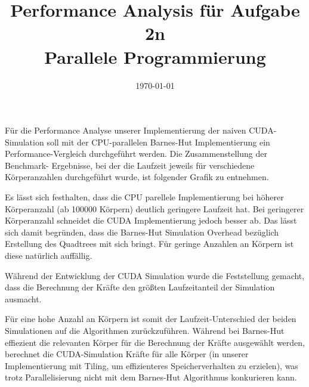 \documentclass[
  ngerman,
  color=8c,
  submission,
  boxarc,
  fleqn,
]{rubos-tuda-template}
\date{\today}
\begin{document}
\title[Parallele Programmierung]{Performance Analysis für Aufgabe 2n\\ Parallele Programmierung}
\maketitle{}

Für die Performance Analyse unserer Implementierung der naiven CUDA-Simulation soll mit der CPU-parallelen
Barnes-Hut Implementierung ein Performance-Vergleich durchgeführt werden. Die Zusammenstellung der Benchmark-
Ergebnisse, bei der die Laufzeit jeweils für verschiedene Körperanzahlen durchgeführt wurde, ist folgender 
Grafik zu entnehmen.


Es lässt sich festhalten, dass die CPU parellele Implementierung bei höherer Körperanzahl (ab 100000 Körpern) deutlich geringere
Laufzeit hat. Bei geringerer Körperanzahl schneidet die CUDA Implementierung jedoch besser ab. Das lässt sich damit begründen, dass 
die Barnes-Hut Simulation Overhead bezüglich Erstellung des Quadtrees mit sich bringt. Für geringe Anzahlen an Körpern ist diese 
natürlich auffällig. 

Während der Entwicklung der CUDA Simulation wurde die Feststellung gemacht, dass die Berechnung der Kräfte den größten Laufzeitanteil der Simulation ausmacht.

Für eine hohe Anzahl an Körpern ist somit der Laufzeit-Unterschied der beiden Simulationen auf die Algorithmen zurückzuführen. Während bei 
Barnes-Hut effiezient die relevanten Körper für die Berechnung der Kräfte ausgewählt werden, berechnet die CUDA-Simulation Kräfte für alle 
Körper (in unserer Implementierung mit Tiling, um effizienteres Speicherverhalten zu erzielen), was trotz Parallelisierung nicht mit dem 
Barnes-Hut Algorithmus konkurieren kann. 
\end{document}
